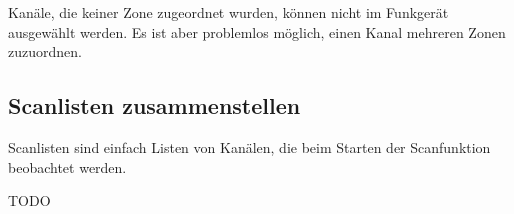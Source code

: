 \begin{hinweis}
 Kanäle, die keiner Zone zugeordnet wurden, können nicht im Funkgerät ausgewählt werden. Es ist aber problemlos möglich, einen Kanal mehreren Zonen zuzuordnen.
\end{hinweis}

\subsection{Scanlisten zusammenstellen}
Scanlisten sind einfach Listen von Kanälen, die beim Starten der Scanfunktion beobachtet werden.

TODO
